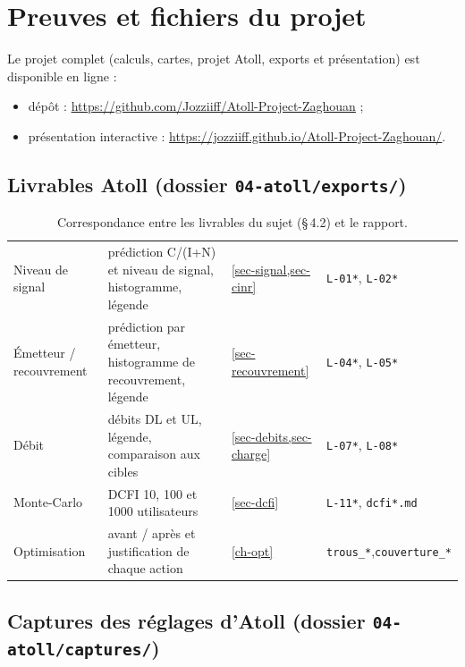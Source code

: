 \chapter{Preuves et fichiers du projet}
\label{ann-preuves}

Le projet complet (calculs, cartes, projet Atoll, exports et présentation) est disponible en ligne :
\begin{itemize}
  \item dépôt : \url{https://github.com/Jozziiff/Atoll-Project-Zaghouan} ;
  \item présentation interactive : \url{https://jozziiff.github.io/Atoll-Project-Zaghouan/}.
\end{itemize}

\section*{Livrables Atoll (dossier \texttt{04-atoll/exports/})}

\begin{table}[H]
\centering
\caption{Correspondance entre les livrables du sujet (§\,4.2) et le rapport.}
\label{tab-livrables}
\footnotesize
\begin{tabularx}{\textwidth}{@{}p{}Lp{0.17\textwidth}p{0.2\textwidth}@{}}
\toprule
{} &  &  &  \\
\midrule
Niveau de signal & prédiction C/(I+N) et niveau de signal, histogramme, légende & \cref{sec-signal,sec-cinr} & \texttt{L-01*}, \texttt{L-02*} \\
Émetteur / recouvrement & prédiction par émetteur, histogramme de recouvrement, légende & \cref{sec-recouvrement} & \texttt{L-04*}, \texttt{L-05*} \\
Débit & débits DL et UL, légende, comparaison aux cibles & \cref{sec-debits,sec-charge} & \texttt{L-07*}, \texttt{L-08*} \\
Monte-Carlo & DCFI 10, 100 et \num{1000} utilisateurs & \cref{sec-dcfi} & \texttt{L-11*}, \texttt{dcfi*.md} \\
Optimisation & avant / après et justification de chaque action & \cref{ch-opt} & \texttt{trous\_*},\newline \texttt{couverture\_*} \\
\bottomrule
\end{tabularx}
\end{table}

\section*{Captures des réglages d'Atoll (dossier \texttt{04-atoll/captures/})}

